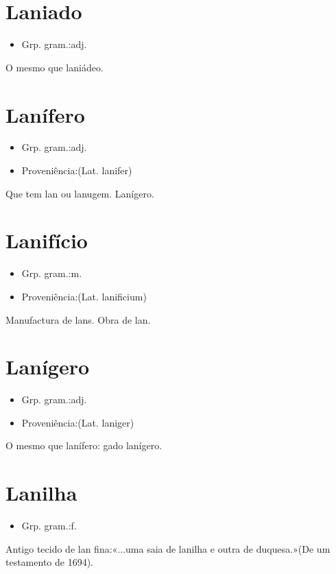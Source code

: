 \section{Laniado}
\begin{itemize}
\item {Grp. gram.:adj.}
\end{itemize}
O mesmo que \textunderscore laniádeo\textunderscore .
\section{Lanífero}
\begin{itemize}
\item {Grp. gram.:adj.}
\end{itemize}
\begin{itemize}
\item {Proveniência:(Lat. \textunderscore lanifer\textunderscore )}
\end{itemize}
Que tem lan ou lanugem.
Lanígero.
\section{Lanifício}
\begin{itemize}
\item {Grp. gram.:m.}
\end{itemize}
\begin{itemize}
\item {Proveniência:(Lat. \textunderscore lanificium\textunderscore )}
\end{itemize}
Manufactura de lans.
Obra de lan.
\section{Lanígero}
\begin{itemize}
\item {Grp. gram.:adj.}
\end{itemize}
\begin{itemize}
\item {Proveniência:(Lat. \textunderscore laniger\textunderscore )}
\end{itemize}
O mesmo que \textunderscore lanífero\textunderscore : \textunderscore gado lanígero\textunderscore .
\section{Lanilha}
\begin{itemize}
\item {Grp. gram.:f.}
\end{itemize}
Antigo tecido de lan fina:«\textunderscore ...uma saia de lanilha e outra de duquesa.\textunderscore »(De um testamento de 1694).
